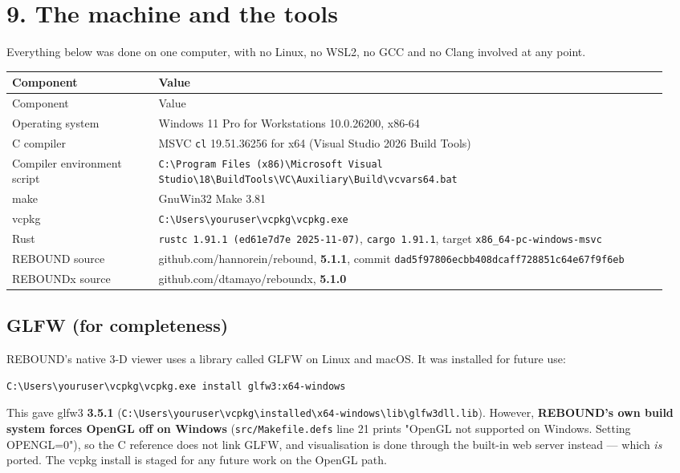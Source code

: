 \documentclass[11pt]{article}
\begin{document}
\section{9. The machine and the tools}

Everything below was done on one computer, with no Linux, no WSL2, no GCC and no Clang involved at any point.

\begin{longtable}{L{0.212\linewidth}L{0.738\linewidth}}
\toprule
Component & Value \\
\midrule
\endfirsthead
\toprule
Component & Value \\
\midrule
\endhead
Operating system & Windows 11 Pro for Workstations 10.0.26200, x86-64 \\
C compiler & MSVC \texttt{cl} 19.51.36256 for x64 (Visual Studio 2026 Build Tools) \\
Compiler environment script & \texttt{C:\textbackslash{}Program Files (x86)\textbackslash{}Microsoft Visual Studio\textbackslash{}18\textbackslash{}BuildTools\textbackslash{}VC\textbackslash{}Auxiliary\textbackslash{}Build\textbackslash{}vcvars64.bat} \\
make & GnuWin32 Make 3.81 \\
vcpkg & \texttt{C:\textbackslash{}Users\textbackslash{}youruser\textbackslash{}vcpkg\textbackslash{}vcpkg.exe} \\
Rust & \texttt{rustc 1.91.1 (ed61e7d7e 2025-11-07)}, \texttt{cargo 1.91.1}, target \texttt{x86\_64-pc-windows-msvc} \\
REBOUND source & github.com/hannorein/rebound, \textbf{5.1.1}, commit \texttt{dad5f97806ecbb408dcaff728851c64e67f9f6eb} \\
REBOUNDx source & github.com/dtamayo/reboundx, \textbf{5.1.0} \\
\bottomrule
\end{longtable}

\subsection{GLFW (for completeness)}

REBOUND's native 3-D viewer uses a library called GLFW on Linux and macOS. It was installed for future use:

\begin{lstlisting}
C:\Users\youruser\vcpkg\vcpkg.exe install glfw3:x64-windows
\end{lstlisting}

This gave glfw3 \textbf{3.5.1} (\texttt{C:\textbackslash{}Users\textbackslash{}youruser\textbackslash{}vcpkg\textbackslash{}installed\textbackslash{}x64-windows\textbackslash{}lib\textbackslash{}glfw3dll.lib}). However, \textbf{REBOUND's own build system forces OpenGL off on Windows} (\texttt{src/Makefile.defs} line 21 prints "OpenGL not supported on Windows. Setting OPENGL=0"), so the C reference does not link GLFW, and visualisation is done through the built-in web server instead --- which \emph{is} ported. The vcpkg install is staged for any future work on the OpenGL path.
\end{document}
